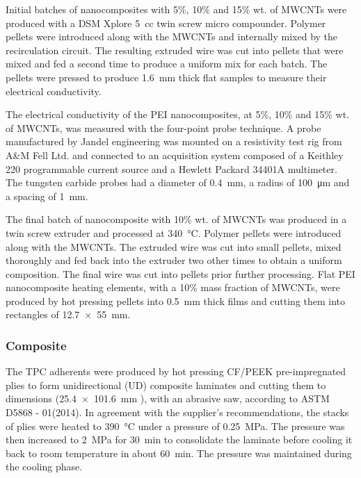 \documentclass[11pt,review,times]{elsarticle}
\begin{document}
Initial batches of nanocomposites with 5\%, 10\% and 15\% wt. of MWCNTs were produced with a DSM Xplore 5~cc twin screw micro compounder. 
Polymer pellets were introduced along with the MWCNTs and internally mixed by the recirculation circuit.
The resulting extruded wire was cut into pellets that were mixed and fed a second time to produce a uniform mix for each batch. 
The pellets were pressed to produce \SI{1.6}{\mm} thick flat samples to measure their electrical conductivity.  

The electrical conductivity of the PEI nanocomposites, at 5\%, 10\% and 15\% wt. of MWCNTs, was measured with the four-point probe technique. 
A probe manufactured by Jandel engineering was mounted on a resistivity test rig from A\&M Fell Ltd. and connected to an acquisition system composed of a Keithley 220 programmable current source and a Hewlett Packard 34401A multimeter. 
The tungsten carbide probes had a diameter of \SI{0.4}{\mm}, a radius of \SI{100}{\um} and a spacing of \SI{1}{\mm}. 

The final batch of nanocomposite with 10\% wt. of MWCNTs was produced in a twin screw extruder and processed at \SI{340}{\celsius}. 
Polymer pellets were introduced along with the MWCNTs. 
The extruded wire was cut into small pellets, mixed thoroughly and fed back into the extruder two other times to obtain a uniform composition. 
The final wire was cut into pellets prior further processing. 
Flat PEI nanocomposite heating elements, with a 10\% mass fraction of MWCNTs, were produced by hot pressing pellets into \SI{0.5}{\milli\metre} thick films and cutting them into rectangles of \SI{12.7 x 55}{\milli\metre}. 

\subsubsection{Composite}

The TPC adherents were produced by hot pressing CF/PEEK pre-impregnated plies to form unidirectional (UD) composite laminates and cutting them to dimensions (\SI{25.4 x 101.6}{\milli\metre} ), with an abrasive saw, according to ASTM D5868 - 01(2014). 
In agreement with the supplier’s recommendations, the stacks of plies were heated to \SI{390}{\celsius} under a pressure of \SI{0.25}{\MPa}. 
The pressure was then increased to \SI{2}{\MPa} for \SI{30}{\minute} to consolidate the laminate before cooling it back to room temperature in about \SI{60}{\minute}. 
The pressure was maintained during the cooling phase. 
\end{document}
